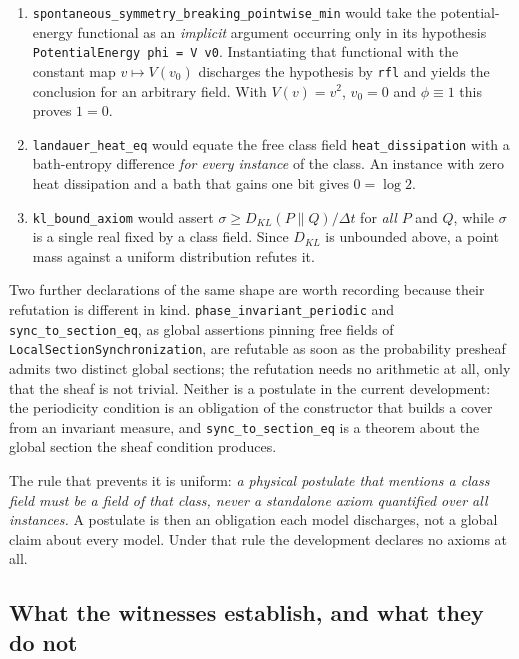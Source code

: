 \documentclass{article}
\begin{document}
\begin{enumerate}
\item \nolinkurl{spontaneous_symmetry_breaking_pointwise_min} would take the potential-energy functional as an \emph{implicit} argument occurring only in its hypothesis \texttt{PotentialEnergy phi = V v0}. Instantiating that functional with the constant map $v\mapsto V(v_0)$ discharges the hypothesis by \texttt{rfl} and yields the conclusion for an arbitrary field. With $V(v) = v^2$, $v_0 = 0$ and $\phi \equiv 1$ this proves $1 = 0$.
\item \nolinkurl{landauer_heat_eq} would equate the free class field \nolinkurl{heat_dissipation} with a bath-entropy difference \emph{for every instance} of the class. An instance with zero heat dissipation and a bath that gains one bit gives $0 = \log 2$.
\item \nolinkurl{kl_bound_axiom} would assert $\sigma \ge D_{KL}(P\|Q)/\Delta t$ for \emph{all} $P$ and $Q$, while $\sigma$ is a single real fixed by a class field. Since $D_{KL}$ is unbounded above, a point mass against a uniform distribution refutes it.
\end{enumerate}

Two further declarations of the same shape are worth recording because their refutation is different in kind. \nolinkurl{phase_invariant_periodic} and \nolinkurl{sync_to_section_eq}, as global assertions pinning free fields of \texttt{LocalSectionSynchronization}, are refutable as soon as the probability presheaf admits two distinct global sections; the refutation needs no arithmetic at all, only that the sheaf is not trivial. Neither is a postulate in the current development: the periodicity condition is an obligation of the constructor that builds a cover from an invariant measure, and \nolinkurl{sync_to_section_eq} is a theorem about the global section the sheaf condition produces.

The rule that prevents it is uniform: \emph{a physical postulate that mentions a class field must be a field of that class, never a standalone axiom quantified over all instances.} A postulate is then an obligation each model discharges, not a global claim about every model. Under that rule the development declares no axioms at all.

\subsection{What the witnesses establish, and what they do not}
\end{document}
